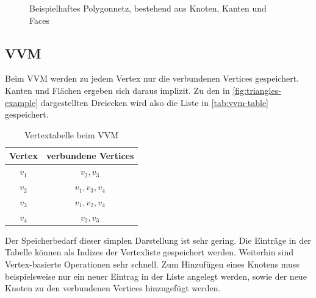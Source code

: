 \begin{figure}[H]
\centering
{}
\caption{Beispielhaftes Polygonnetz, bestehend aus Knoten, Kanten und Faces}
\label{fig:triangles-example}
\end{figure}

\subsection{\acl{VVM}}
\label{subsec:v-v-mesh}

Beim \ac{VVM} werden zu jedem Vertex nur die verbundenen Vertices gespeichert.
Kanten und Flächen ergeben sich daraus implizit.
Zu den in \autoref{fig:triangles-example} dargestellten Dreiecken wird also die Liste in \autoref{tab:vvm-table} gespeichert.

\begin{table}[H]
\centering
\begin{tabular}{| c | c |}
	\hline
	Vertex & verbundene Vertices\\
	\hline
	$v_1$ & $v_2, v_3$\\
	$v_2$ & $v_1, v_3, v_4$\\
	$v_3$ & $v_1, v_2, v_4$\\
	$v_4$ & $v_2, v_3$\\
	\hline
\end{tabular}
\caption{Vertextabelle beim \ac{VVM}}
\label{tab:vvm-table}
\end{table}

Der Speicherbedarf dieser simplen Darstellung ist sehr gering.
Die Einträge in der Tabelle können als Indizes der Vertexliste gespeichert werden.
Weiterhin sind Vertex-basierte Operationen sehr schnell.
Zum Hinzufügen eines Knotens muss beispielsweise nur ein neuer Eintrag in der Liste angelegt werden, sowie der neue Knoten zu den verbundenen Vertices hinzugefügt werden.

